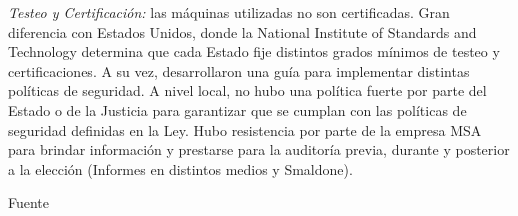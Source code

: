 \textit{Testeo y Certificación:} las máquinas utilizadas no son certificadas. Gran diferencia con Estados Unidos, donde la National Institute of Standards and Technology determina que cada Estado fije distintos grados mínimos de testeo y certificaciones. A su vez, desarrollaron una guía para implementar distintas políticas de seguridad. A nivel local, no hubo una política fuerte por parte del Estado o de la Justicia para garantizar que se cumplan con las políticas de seguridad definidas en la Ley. Hubo resistencia por parte de la empresa MSA para brindar información y prestarse para la auditoría previa, durante y posterior a la elección (Informes en distintos medios y Smaldone).


Fuente \cite{hopkins}

